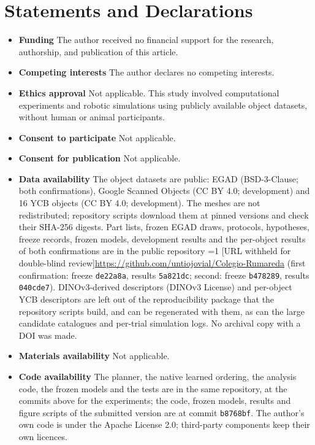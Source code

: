 \documentclass[pdflatex,sn-mathphys-num,iicol]{sn-jnl}
\providecommand{\anonymous}{0}
\newcommand{\anon}[2]{\ifnum\anonymous=1 #1\else #2\fi}
\begin{document}
\section*{Statements and Declarations}

\begin{itemize}
\item \textbf{Funding} The author received no financial support for the research, authorship, and publication of this article.
\item \textbf{Competing interests} The author declares no competing interests.
\item \textbf{Ethics approval} Not applicable. This study involved computational experiments and robotic simulations using publicly available object datasets, without human or animal participants.
\item \textbf{Consent to participate} Not applicable.
\item \textbf{Consent for publication} Not applicable.
\item \textbf{Data availability} The object datasets are public: EGAD \cite{morrison2020egad} (BSD-3-Clause; both confirmations), Google Scanned Objects \cite{downs2022gso} (CC BY 4.0; development) and 16 YCB objects (CC BY 4.0; development). The meshes are not redistributed; repository scripts download them at pinned versions and check their SHA-256 digests. Part lists, frozen EGAD draws, protocols, hypotheses, freeze records, frozen models, development results and the per-object results of both confirmations are in the public repository \anon{[URL withheld for double-blind review]}{\url{https://github.com/untiojovial/Colegio-Rumareda}} (first confirmation: freeze \texttt{de22a8a}, results \texttt{5a821dc}; second: freeze \texttt{b478289}, results \texttt{040cde7}). DINOv3-derived descriptors (DINOv3 License) and per-object YCB descriptors are left out of the reproducibility package that the repository scripts build, and can be regenerated with them, as can the large candidate catalogues and per-trial simulation logs. No archival copy with a DOI was made.
\item \textbf{Materials availability} Not applicable.
\item \textbf{Code availability} The planner, the native learned ordering, the analysis code, the frozen models and the tests are in the same repository, at the commits above for the experiments; the code, frozen models, results and figure scripts of the submitted version are at commit \texttt{b8768bf}. The author's own code is under the Apache License 2.0; third-party components keep their own licences.

\end{itemize}
\end{document}
